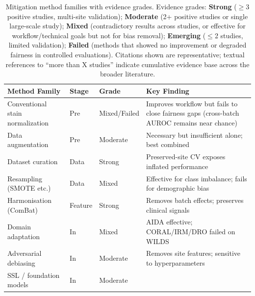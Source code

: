 \begin{table}[!ht]
  \centering
    \caption{Mitigation method families with evidence grades.
           Evidence grades: \textbf{Strong} ($\geq$3 positive studies,
           multi-site validation); \textbf{Moderate} (2+ positive
           studies or single large-scale study);
           \textbf{Mixed} (contradictory results across studies, or effective for workflow/technical goals but not for bias removal);
           \textbf{Emerging} ($\leq$2 studies, limited validation);
           \textbf{Failed} (methods that showed no improvement
           or degraded fairness in controlled evaluations).
           Citations shown are representative; textual references to
           ``more than X studies'' indicate cumulative evidence base
           across the broader literature.}
  \label{tab:mitigation_summary}
  \small
  \begin{tabularx}{\linewidth}{@{}l l l X@{}}
    \toprule
    \textbf{Method Family} & \textbf{Stage} &
      \textbf{Grade} & \textbf{Key Finding} \\
    \midrule
    Conventional stain normalization~\citep{voon2023evaluating, lin2025stain, komen2024batch}     & Pre  & Mixed/Failed
      & Improves workflow but fails to close fairness gaps (cross-batch AUROC remains near chance) \\
    Data augmentation~\citep{faryna2024automatic, franchet2024bias}       & Pre  & Moderate
      & Necessary but insufficient alone; best combined \\
    Dataset curation~\citep{howard2021site, weng2024grandqc}        & Data & Strong
      & Preserved-site CV exposes inflated performance \\
    Resampling (SMOTE etc.)~\citep{rezama2018imbalanced, soltan2024challenges} & Data & Mixed
      & Effective for class imbalance; fails for demographic bias \\
    Harmonisation (ComBat)~\citep{murchan2024combat, bidgoli2022bias}  & Feature & Strong
      & Removes batch effects; preserves clinical signals \\
    Domain adaptation~\citep{asadiaghbolagh2024learning, koh2021wilds}       & In   & Mixed
      & AIDA effective; CORAL/IRM/DRO failed on WILDS \\
    Adversarial debiasing~\citep{lafarge2019learning, otalora2019staining}   & In   & Moderate
      & Removes site features; sensitive to hyperparameters \\
    SSL / foundation models~\citep{ciga2023self, komen2024batch} & In   & Moderate

\end{tabularx}
\end{table}
